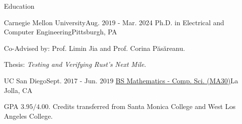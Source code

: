 \documentclass{resume} %
\begin{document}
\begin{rSection}{Education}
  \begin{rSubsection}{Carnegie Mellon University}{Aug. $2019$ - Mar. 2024}
    {Ph.D. in Electrical and Computer
      Engineering}{Pittsburgh, PA}
  \item Co-Advised by: Prof. Limin Jia and Prof. Corina P\u{a}s\u{a}reanu.
  \item Thesis: \textit{Testing and Verifying Rust's Next Mile}.
  \end{rSubsection}

  \begin{rSubsection}{UC San Diego}{Sept. $2017$ - Jun. $2019$}{
      \href{https://catalog.ucsd.edu/curric/MATH-ug.html}
      {BS Mathematics - Comp. Sci. (MA30)}}{La Jolla, CA}
  \item GPA $3.95/4.00$. Credits transferred from Santa Monica College
    and West Los Angeles College.
  \end{rSubsection}


\end{rSection}
\end{document}
